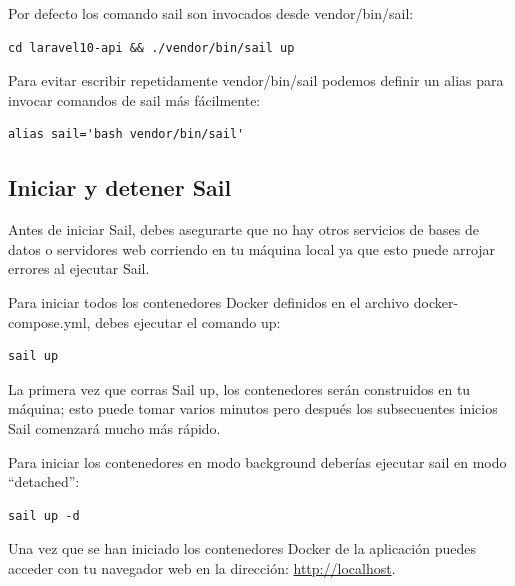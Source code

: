 \documentclass[11pt]{article}
\begin{document}
Por defecto los comando sail son invocados desde vendor/bin/sail:
\begin{verbatim}
cd laravel10-api && ./vendor/bin/sail up
\end{verbatim}

Para evitar escribir repetidamente vendor/bin/sail podemos definir un
alias para invocar comandos de sail más fácilmente:
\begin{verbatim}
alias sail='bash vendor/bin/sail'
\end{verbatim}

\subsection{Iniciar y detener Sail}
\label{sec:orgfbf1b57}
Antes de iniciar Sail, debes asegurarte que no hay otros servicios de
bases de datos o servidores web corriendo en tu máquina local ya que
esto puede arrojar errores al ejecutar Sail.

Para iniciar todos los contenedores Docker definidos en el archivo
docker-compose.yml, debes ejecutar el comando up:
\begin{verbatim}
sail up
\end{verbatim}

La primera vez que corras Sail up, los contenedores serán construidos
en tu máquina; esto puede tomar varios minutos pero después los
subsecuentes inicios Sail comenzará mucho más rápido.

Para iniciar los contenedores en modo background deberías ejecutar
sail en modo “detached”:
\begin{verbatim}
sail up -d
\end{verbatim}

Una vez que se han iniciado los contenedores Docker de la aplicación
puedes acceder con tu navegador web en la dirección: \url{http://localhost}.
\end{document}
